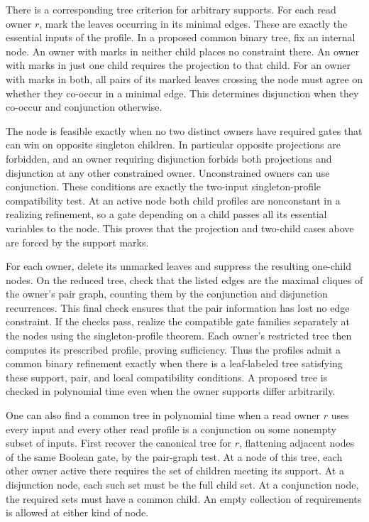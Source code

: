 There is a corresponding tree criterion for arbitrary supports.
For each read owner $r$, mark the leaves occurring in its minimal
edges. These are exactly the essential inputs of the profile.
In a proposed common binary tree, fix an internal node. An owner
with marks in neither child places no constraint there. An owner
with marks in just one child requires the projection to that
child. For an owner with marks in both, all pairs of its marked
leaves crossing the node must agree on whether they co-occur in
a minimal edge. This determines disjunction when they co-occur
and conjunction otherwise.

The node is feasible exactly when no two distinct owners have
required gates that can win on opposite singleton children.
In particular opposite projections are forbidden, and an owner
requiring disjunction forbids both projections and disjunction
at any other constrained owner. Unconstrained owners can use
conjunction. These conditions are exactly the two-input
singleton-profile compatibility test. At an active node both
child profiles are nonconstant in a realizing refinement, so a
gate depending on a child passes all its essential variables
to the node. This proves that the projection and two-child cases
above are forced by the support marks.

For each owner, delete its unmarked leaves and suppress the
resulting one-child nodes. On the reduced tree, check that the
listed edges are the maximal cliques of the owner's pair graph,
counting them by the conjunction and disjunction recurrences.
This final check ensures that the pair information has lost no
edge constraint. If the checks pass, realize the compatible
gate families separately at the nodes using the singleton-profile
theorem. Each owner's restricted tree then computes its
prescribed profile, proving sufficiency. Thus the profiles admit
a common binary refinement exactly when there is a leaf-labeled
tree satisfying these support, pair, and local compatibility
conditions. A proposed tree is checked in polynomial time even
when the owner supports differ arbitrarily.

One can also find a common tree in polynomial time when a read
owner $r$ uses every input and every other read profile is a
conjunction on some nonempty subset of inputs. First recover the
canonical tree for $r$, flattening adjacent nodes of the same
Boolean gate, by the pair-graph test. At a node of this tree,
each other owner active there requires the set of children
meeting its support. At a disjunction node, each such set must
be the full child set. At a conjunction node, the required
sets must have a common child. An empty collection of requirements
is allowed at either kind of node.

